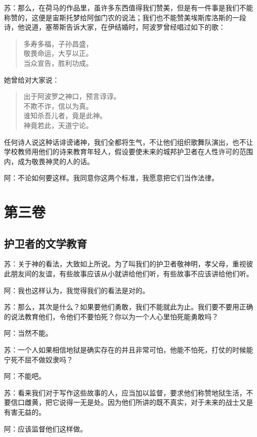 \documentclass[11pt,oneside]{book}
\begin{document}
\begin{common-format}
苏：那么，在荷马的作品里，虽许多东西值得我们赞美，但是有一件事是我们不能称赞的，这便是宙斯托梦给阿伽门农的说法；我们也不能赞美埃斯库洛斯的一段诗，他说道，塞蒂斯告诉大家，在伊结婚时，阿波罗曾经唱过如下的歌：
\begin{verse}
多寿多福，子孙昌盛，\\
敬畏命运，大亨以正。\\
当众宣告，胜利功成。
\end{verse}
她曾给对大家说：
\begin{verse}
出于阿波罗之神口，预言谆谆。\\
不欺不诈，信以为真。\\
谁知杀吾儿者，竟是此神。\\
神竟若此，天道宁论。
\end{verse}
任何诗人说这种话诽谤诸神，我们全都将生气，不让他们组织歌舞队演出，也不让学校教师用他们的诗来教育年轻人，假设要使未来的城邦护卫者在人性许可的范围内，成为敬畏神灵的人的话。

阿：不论如何要这样。我同意你这两个标准，我愿意把它们当作法律。



\chapter{第三卷}
\section{护卫者的文学教育}
苏：关于神的看法，大致如上所说。为了叫我们的护卫者敬神明，孝父母，重视彼此朋友间的友谊，有些故事应该从小就讲给他们听，有些故事不应该讲给他们听。

阿：我也这样认为，我觉得我们的看法是对的。

苏：那么，其次是什么？如果要他们勇敢，我们不能就此为止。我们要不要用正确的说法教育他们，令他们不要怕死？你以为一个人心里怕死能勇敢吗？

阿：当然不能。

苏：一个人如果相信地狱是确实存在的并且非常可怕，他能不怕死，打仗的时候能宁死不屈不做奴隶吗？

阿：不能吧。

苏：看来我们对于写作这些故事的人，应当加以监督，要求他们称赞地狱生活，不要信口雌黄，把它说得一无是处。因为他们所讲的既不真实，对于未来的战士又是有害无益的。

阿：应该监督他们这样做。


\end{common-format}
\end{document}
